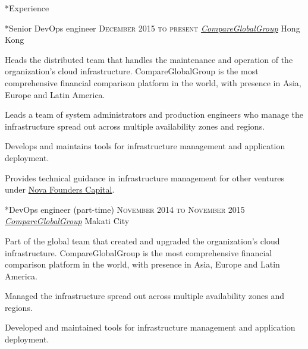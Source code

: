 \documentclass[10pt, a4paper, final]{article}
\begin{document}
\vspace{1em}

\begin{section}*{Experience}
  \begin{subsection}*{Senior DevOps engineer \hfill\textsc{December 2015 to present}}
    \href{http://www.compareglobalgroup.com}{\textit{CompareGlobalGroup}} \hfill Hong Kong
    \vspace{1em}

    Heads the distributed team that handles the maintenance and operation of the organization's cloud infrastructure. CompareGlobalGroup is the most comprehensive financial comparison platform in the world, with presence in Asia, Europe and Latin America.
    \vspace{1em}
    \begin{compactitem}
      \item Leads a team of system administrators and production engineers who manage the infrastructure spread out across multiple availability zones and regions.
      \item Develops and maintains tools for infrastructure management and application deployment.
      \item Provides technical guidance in infrastructure management for other ventures under \href{http://www.novafounders.com/}{Nova Founders Capital}.
      
    \end{compactitem}
  \end{subsection}
  \vspace{2.5em}

  \begin{subsection}*{DevOps engineer (part-time) \hfill\textsc{November 2014 to November 2015}}
    \href{http://www.compareglobalgroup.com}{\textit{CompareGlobalGroup}} \hfill Makati City
    \vspace{1em}

    Part of the global team that created and upgraded the organization's cloud infrastructure. CompareGlobalGroup is the most comprehensive financial comparison platform in the world, with presence in Asia, Europe and Latin America.
    \vspace{1em}
    \begin{compactitem}
      \item Managed the infrastructure spread out across multiple availability zones and regions.
      \item Developed and maintained tools for infrastructure management and application deployment.
      

\end{compactitem}
\end{subsection}
\end{section}
\end{document}
